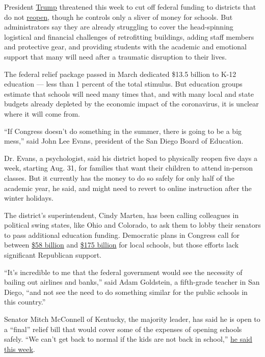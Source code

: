 President
\href{https://www.nytimes3xbfgragh.onion/2020/07/10/us/politics/trump-schools-reopening.html}{Trump}
threatened this week to cut off federal funding to districts that do not
\href{https://www.nytimes3xbfgragh.onion/2020/07/10/us/politics/trump-schools-reopening.html}{reopen},
though he controls only a sliver of money for schools. But
administrators say they are already struggling to cover the
head-spinning logistical and financial challenges of retrofitting
buildings, adding staff members and protective gear, and providing
students with the academic and emotional support that many will need
after a traumatic disruption to their lives.

The federal relief package passed in March dedicated \$13.5 billion to
K-12 education --- less than 1 percent of the total stimulus. But
education groups estimate that schools will need many times that, and
with many local and state budgets already depleted by the economic
impact of the coronavirus, it is unclear where it will come from.

``If Congress doesn't do something in the summer, there is going to be a
big mess,'' said John Lee Evans, president of the San Diego Board of
Education.

Dr. Evans, a psychologist, said his district hoped to physically reopen
five days a week, starting Aug. 31, for families that want their
children to attend in-person classes. But it currently has the money to
do so safely for only half of the academic year, he said, and might need
to revert to online instruction after the winter holidays.

The district's superintendent, Cindy Marten, has been calling colleagues
in political swing states, like Ohio and Colorado, to ask them to lobby
their senators to pass additional education funding. Democratic plans in
Congress call for between
\href{https://blogs.edweek.org/edweek/campaign-k-12/2020/05/heroes-act-education-funding-house-passes.html}{\$58
billion} and
\href{https://www.help.senate.gov/imo/media/doc/CCCERA\%20Fact\%20Sheet\%20062920.pdf}{\$175
billion} for local schools, but those efforts lack significant
Republican support.

``It's incredible to me that the federal government would see the
necessity of bailing out airlines and banks,'' said Adam Goldstein, a
fifth-grade teacher in San Diego, ``and not see the need to do something
similar for the public schools in this country.''

Senator Mitch McConnell of Kentucky, the majority leader, has said he is
open to a ``final'' relief bill that would cover some of the expenses of
opening schools safely. ``We can't get back to normal if the kids are
not back in school,''
\href{https://www.courier-journal.com/story/news/politics/2020/07/08/cdc-guidelines-school-reopenings-mitch-mcconnell-trump-differ/5399417002/}{he
said this week}.

